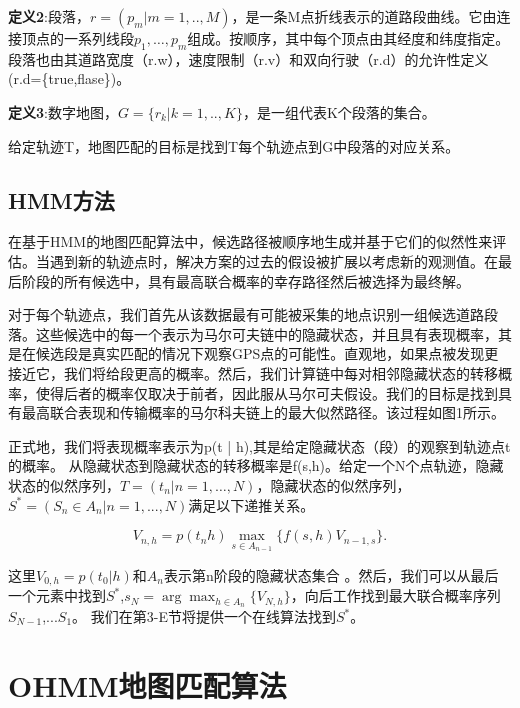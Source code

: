\textbf{定义2}:段落，$r=(p_{m} | m=1,..,M)$，是一条M点折线表示的道路段曲线。它由连接顶点的一系列线段$p_{1},…,p_{m}$组成。按顺序，其中每个顶点由其经度和纬度指定。 段落也由其道路宽度（r.w），速度限制（r.v）和双向行驶（r.d）的允许性定义(r.d=\{true,flase\})。

\textbf{定义3}:数字地图，$G=\{r_{k} | k=1,..,K\}$，是一组代表K个段落的集合。

给定轨迹T，地图匹配的目标是找到T每个轨迹点到G中段落的对应关系。

\subsection{HMM方法}
在基于HMM的地图匹配算法中，候选路径被顺序地生成并基于它们的似然性来评估。当遇到新的轨迹点时，解决方案的过去的假设被扩展以考虑新的观测值。在最后阶段的所有候选中，具有最高联合概率的幸存路径然后被选择为最终解。

对于每个轨迹点，我们首先从该数据最有可能被采集的地点识别一组候选道路段落。这些候选中的每一个表示为马尔可夫链中的隐藏状态，并且具有表现概率，其是在候选段是真实匹配的情况下观察GPS点的可能性。直观地，如果点被发现更接近它，​​我们将给段更高的概率。然后，我们计算链中每对相邻隐藏状态的转移概率，使得后者的概率仅取决于前者，因此服从马尔可夫假设。我们的目标是找到具有最高联合表现和传输概率的马尔科夫链上的最大似然路径。该过程如图1所示。

正式地，我们将表现概率表示为p(t | h),其是给定隐藏状态（段）的观察到轨迹点t的概率。 从隐藏状态到隐藏状态的转移概率是f(s,h)。给定一个N个点轨迹，隐藏状态的似然序列，$T=(t_{n} | n=1,…,N)$，隐藏状态的似然序列，$S^{*}=(S_{n}\in A_{n} |n=1,...,N)$满足以下递推关系。

\begin{equation*}
V_{n,h}=p(t_{n}h)\max_{s\in A_{n-1}} \{f(s,h)V_{n-1,s}\}.
\end{equation*}

这里$V_{0,h}=p(t_{0}|h)$和$A_{n}$表示第n阶段的隐藏状态集合 。然后，我们可以从最后一个元素中找到$S^{*}$,$s_{N}=\arg\max_{h\in A_{n}}\{V_{N,h}\}$，向后工作找到最大联合概率序列$S_{N-1}$,...$S_{1}$。 我们在第3-E节将提供一个在线算法找到$S^{*}$。


\section{OHMM地图匹配算法}

